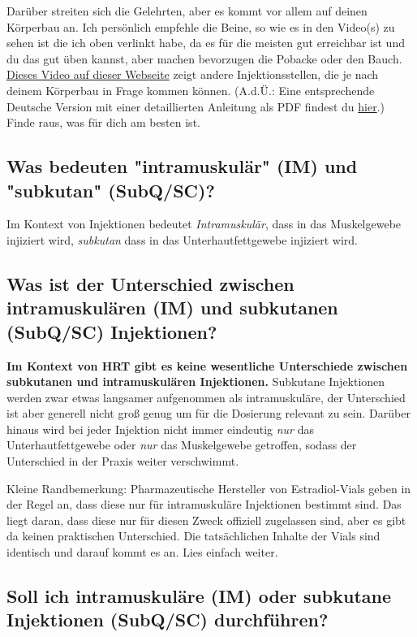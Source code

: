\documentclass{article}
\begin{document}
Darüber streiten sich die Gelehrten, aber es kommt vor allem auf deinen Körperbau an. Ich persönlich empfehle die Beine, so wie es in den Video(s) zu sehen ist die ich oben verlinkt habe, da es für die meisten gut erreichbar ist und du das gut üben kannst, aber machen bevorzugen die Pobacke oder den Bauch. \href{https://vertisis.com/articles/how-to-self-administer-a-subcutaneous-injection}{Dieses Video auf dieser Webseite} zeigt andere Injektionsstellen, die je nach deinem Körperbau in Frage kommen können. (A.d.Ü.: Eine entsprechende Deutsche Version mit einer detaillierten Anleitung als PDF findest du \href{https://www.bk-trier.de/media-bkt/docs/PIZ_HZ_Subkutane_Injektion_2021.pdf}{hier}.) Finde raus, was für dich am besten ist.

\subsection{Was bedeuten "intramuskulär" (IM) und "subkutan" (SubQ/SC)?}

Im Kontext von Injektionen bedeutet \textit{Intramuskulär}, dass in das Muskelgewebe injiziert wird, \textit{subkutan} dass in das Unterhautfettgewebe injiziert wird.

\subsection{Was ist der Unterschied zwischen intramuskulären (IM) und subkutanen (SubQ/SC) Injektionen?}

\textbf{Im Kontext von HRT gibt es keine wesentliche Unterschiede zwischen subkutanen und intramuskulären Injektionen.} Subkutane Injektionen werden zwar etwas langsamer aufgenommen als intramuskuläre, der Unterschied ist aber generell nicht groß genug um für die Dosierung relevant zu sein. Darüber hinaus wird bei jeder Injektion nicht immer eindeutig \textit{nur } das Unterhautfettgewebe oder \textit{nur } das Muskelgewebe getroffen, sodass der Unterschied in der Praxis weiter verschwimmt.

Kleine Randbemerkung: Pharmazeutische Hersteller von Estradiol-Vials geben in der Regel an, dass diese nur für intramuskuläre Injektionen bestimmt sind. Das liegt daran, dass diese nur für diesen Zweck offiziell zugelassen sind, aber es gibt da keinen praktischen Unterschied. Die tatsächlichen Inhalte der Vials sind identisch und darauf kommt es an. Lies einfach weiter.

\subsection{Soll ich intramuskuläre (IM) oder subkutane Injektionen (SubQ/SC) durchführen?}
\end{document}
